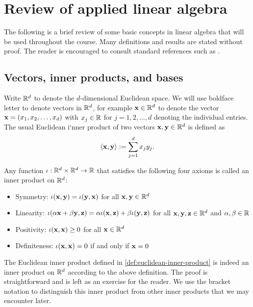 \chapter{Review of applied linear algebra}
\label{ch:Lec0-linalg}

The following is a brief review of some basic concepts in linear algebra that will be used throughout the course. Many definitions and results are stated 
without proof. The reader is encouraged to consult standard references 
such as \cite{olver2006applied,boyd2018introduction,demmel1997applied,matrixcookbook}.


\section{Vectors, inner products, and bases}

Write $\mathbb{R}^d$ to denote the $d$-dimensional Euclidean space. 
We will use boldface letter to denote vectors in $\mathbb{R}^d$,
for example $\mathbf{x} \in \mathbb{R}^d$ to denote the vector 
$\mathbf{x} = (x_1, x_2, \ldots, x_d)$ with $x_j \in \mathbb{R}$ for $j=1,2,\ldots,d$
denoting the individual entries. The usual Euclidean i`nner product of 
two vectors $\mathbf{x}, \mathbf{y} \in \mathbb{R}^d$ is defined as
\begin{equation}\label{def:euclidean-inner-product}
\langle \mathbf{x}, \mathbf{y} \rangle := \sum_{j=1}^d x_j y_j.    
\end{equation}

\begin{definition}
    Any function $\iota: \mathbb{R}^d \times \mathbb{R}^d \to \mathbb{R}$ that satisfies 
    the following four axioms is called an inner product on $\mathbb{R}^d$:
    \begin{itemize}
        \item Symmetry: $\iota(\mathbf{x}, \mathbf{y}) = \iota(\mathbf{y}, \mathbf{x})$ for all $\mathbf{x}, \mathbf{y} \in \mathbb{R}^d$
        \item Linearity: $\iota(\alpha \mathbf{x} + \beta \mathbf{y}, \mathbf{z}) = \alpha \iota(\mathbf{x}, \mathbf{z}) + \beta \iota(\mathbf{y}, \mathbf{z})$ for all $\mathbf{x}, \mathbf{y}, \mathbf{z} \in \mathbb{R}^d$ and $\alpha, \beta \in \mathbb{R}$
        \item Positivity: $\iota(\mathbf{x}, \mathbf{x}) \ge 0$ for all $\mathbf{x} \in \mathbb{R}^d$
        \item Definiteness: $\iota(\mathbf{x}, \mathbf{x}) = 0$ if and only if $\mathbf{x} = 0$
    \end{itemize}
\end{definition}
The Euclidean inner product defined in  \eqref{def:euclidean-inner-product}
is indeed an inner product on $\mathbb{R}^d$ according to the above definition.
The proof is straightforward and is left as an exercise for the reader.
We use the bracket notation to distinguish this inner product from 
other inner products that we may encounter later.


